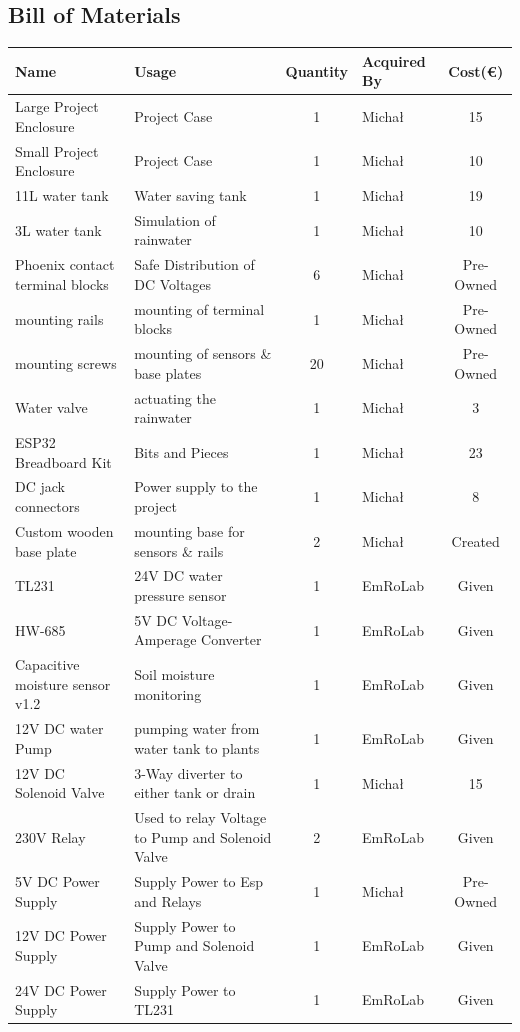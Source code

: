 \documentclass[paper=a4,fontsize=12pt,ngerman]{scrartcl}
\begin{document}
\subsection{Bill of Materials}
\begin{table}[H]
    \centering
    \footnotesize
    \begin{tabularx}{\textwidth}{|l|X|c|l|c|}
    
    \hline
        \textbf{Name} & \textbf{Usage} & \textbf{Quantity} & \textbf{Acquired By} & \textbf{Cost(€)}\\
    \hline
        Large Project Enclosure & Project Case & 1 & Micha{\l} & 15 \\
    \hline
        Small Project Enclosure & Project Case & 1 & Micha{\l} & 10 \\
    \hline
        11L water tank & Water saving tank & 1 & Micha{\l} & 19 \\
    \hline
        3L water tank & Simulation of rainwater & 1 & Micha{\l} & 10 \\
    \hline
       Phoenix contact terminal blocks & Safe Distribution of DC Voltages & 6 & Micha{\l} & Pre-Owned \\
    \hline
        mounting rails  & mounting of terminal blocks & 1 & Micha{\l} & Pre-Owned \\
    \hline
       mounting screws  & mounting of sensors \& base plates & 20 & Micha{\l} & Pre-Owned \\
    \hline
        Water valve & actuating the rainwater & 1 & Micha{\l} & 3 \\
    \hline
        ESP32 Breadboard Kit & Bits and Pieces & 1 & Micha{\l} & 23 \\
    \hline
       DC jack connectors & Power supply to the project & 1 & Micha{\l} & 8 \\
    \hline
       Custom wooden base plate & mounting base for sensors \& rails & 2 & Micha{\l} & Created \\
    \hline
       TL231 & 24V DC water pressure sensor & 1 &EmRoLab  & Given \\
    \hline
       HW-685 & 5V DC Voltage-Amperage Converter & 1 & EmRoLab & Given \\  
    \hline
       Capacitive moisture sensor v1.2 & Soil moisture monitoring & 1 & EmRoLab & Given \\  
    \hline
       12V DC water Pump  & pumping water from water tank to plants & 1 & EmRoLab & Given \\  
    \hline
       12V DC Solenoid Valve  & 3-Way diverter to either tank or drain & 1 & Micha{\l} & 15 \\  
    \hline
       230V Relay  & Used to relay Voltage to Pump and Solenoid Valve & 2 & EmRoLab & Given \\  
    \hline
       5V DC Power Supply & Supply Power to Esp and Relays & 1 & Micha{\l} & Pre-Owned \\  
    \hline
       12V DC Power Supply & Supply Power to Pump and Solenoid Valve & 1 & EmRoLab & Given \\  
    \hline
       24V DC Power Supply & Supply Power to TL231 & 1 & EmRoLab & Given \\
    \hline
    \end{tabularx}
    

\end{table}
\end{document}
